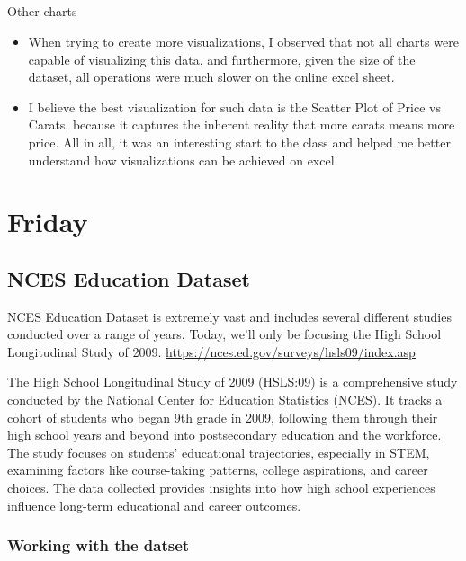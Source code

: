 \documentclass[
  letterpaper,
  DIV=11,
  numbers=noendperiod]{scrreprt}
\makeatletter
\let\oldsubparagraph\subparagraph
\renewcommand{\subparagraph}{
    \@ifstar
      \xxxSubParagraphStar
      \xxxSubParagraphNoStar
  }
\newcommand{\xxxSubParagraphStar}[1]{\oldsubparagraph*{#1}\mbox{}}
\newcommand{\xxxSubParagraphNoStar}[1]{\oldsubparagraph{#1}\mbox{}}
\providecommand{\tightlist}{%
  \setlength{\itemsep}{0pt}\setlength{\parskip}{0pt}}\usepackage{longtable,booktabs,array}
\makeatother
\begin{document}
\subparagraph{Other charts}\label{other-charts}

\begin{itemize}
\tightlist
\item
  When trying to create more visualizations, I observed that not all
  charts were capable of visualizing this data, and furthermore, given
  the size of the dataset, all operations were much slower on the online
  excel sheet.
\item
  I believe the best visualization for such data is the Scatter Plot of
  Price vs Carats, because it captures the inherent reality that more
  carats means more price. All in all, it was an interesting start to
  the class and helped me better understand how visualizations can be
  achieved on excel.
\end{itemize}

\section{Friday}\label{friday-3}

\subsection{NCES Education Dataset}\label{nces-education-dataset}

NCES Education Dataset is extremely vast and includes several different
studies conducted over a range of years. Today, we'll only be focusing
the High School Longitudinal Study of 2009.
\url{https://nces.ed.gov/surveys/hsls09/index.asp}

The High School Longitudinal Study of 2009 (HSLS:09) is a comprehensive
study conducted by the National Center for Education Statistics (NCES).
It tracks a cohort of students who began 9th grade in 2009, following
them through their high school years and beyond into postsecondary
education and the workforce. The study focuses on students' educational
trajectories, especially in STEM, examining factors like course-taking
patterns, college aspirations, and career choices. The data collected
provides insights into how high school experiences influence long-term
educational and career outcomes.

\subsubsection{Working with the datset}\label{working-with-the-datset}
\end{document}
